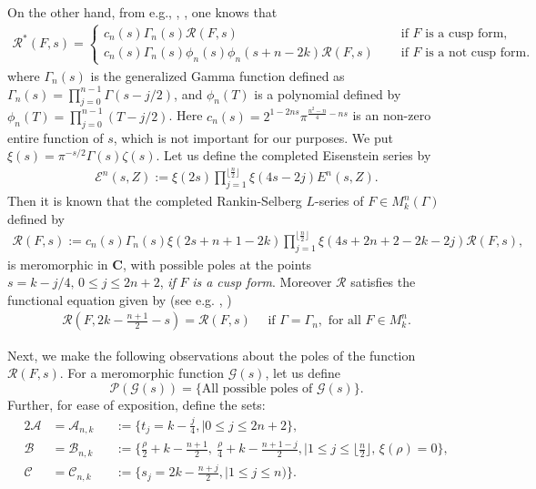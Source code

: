 \documentclass[12pt]{amsart}
\numberwithin{equation}{section}
\theoremstyle{plain}
\theoremstyle{definition}
\newcommand{\C}{\mf C}
\newcommand{\mf}{\mathbf}
\newcommand{\q}{\quad}
\newcommand{\mc}{\mathcal}
\newcommand{\mcr}{\mathscr}
\newcommand{\mkngam}{M^n_k(\Gamma)}
\begin{document}
On the other hand, from e.g., \cite[Remark~3.3]{bo-ch}, \cite[Prop.~2.1]{kalinin}, one knows that 
\begin{align} \label{rf-int-rep}
 \mc R^*(F,s) =\begin{cases}
 c_n(s) \Gamma_n(s) \mc R(F,s)
 \q &\text{ if } F \text{ is a cusp form}, \\
  c_n(s) \Gamma_n(s) \phi_n(s) \phi_n(s+n-2k)  \mc R(F,s) \q &\text{ if } F \text{ is a not cusp form}. 
\end{cases}
\end{align}
where $\Gamma_n(s)$ is the generalized Gamma function defined as $\displaystyle \Gamma_n(s)=\prod\nolimits_{j=0}^{n-1} \Gamma(s-j/2)$, and $ \phi_n(T)$ is a polynomial defined by $\displaystyle \phi_n(T) = \prod\nolimits_{j=0}^{n-1} (T-j/2)$. Here $\displaystyle c_n(s)=2^{1-2ns} \pi^{\frac{n^2-n}{4}-ns}$ is an non-zero entire function of $s$, which is not important for our purposes. We put $\displaystyle \xi(s)=\pi^{-s/2} \Gamma(s) \zeta(s)$. Let us define the completed Eisenstein series by
\begin{align}
    \mathscr E^n(s,Z):= \xi(2s) \prod\nolimits_{j=1}^{\lfloor \frac{n}{2} \rfloor} \xi(4s-2j)E^n(s,Z).
\end{align}
Then it is known that the completed Rankin-Selberg $L$-series of $F \in \mkngam$ defined by
\begin{align} \label{scrF}
    \mathscr R(F,s):=  c_n(s)\Gamma_n(s) \xi(2s +n+1-2k) \prod\nolimits_{j=1}^{\lfloor \frac{n}{2} \rfloor} \xi(4s+2n+2-2k-2j )  \mc R(F,s),
\end{align}
is meromorphic in $\C$, with possible poles at the points $s=k-j/4, \,   0 \le j \le 2n+2$, \textsl{ if} $F$ \textsl{is a cusp form}. Moreover $\mcr R$ satisfies the functional equation given by (see e.g. \cite{kalinin}, \cite{bo-ch})
\begin{align}
    \mathscr R(F,2k- \frac{n+1}{2} -s) = \mathscr R(F,s) \q \text{ if } \Gamma=\Gamma_n, \text{ for all } F \in M^n_k.
\end{align}

Next, we make the following observations about the poles of the function $ \mc R(F,s)$. For a meromorphic function $\mcr G(s)$, let us define
\begin{equation}
\mathscr{P}(\mcr G(s))  = \{ \text{All possible poles of } \mcr G(s) \}.
    \end{equation}
Further, for ease of exposition, define the sets:
\begin{alignat}{2}
    \mathscr{A} &= \mathscr{A}_{n,k} & &:= \{ t_j=k-\frac{j}{4},  \mid 0 \le j \le 2n+2\},\\
    \mathscr{B} &=\mathscr{B}_{n,k} & &:= \{ \frac{\rho}{2} + k - \frac{n+1}{2 },  \ \frac{\rho}{4} + k - \frac{n+1-j}{2} ,  \mid 1 \le j \le \lfloor \frac{n}{2} \rfloor , \, \xi(\rho)=0 \},\\
    \mathscr{C} &=\mathscr{C}_{n,k} & &:=\{ s_j= 2k - \frac{n+j}{2}, \mid 1 \le j \le n)\}.
\end{alignat}
\end{document}
